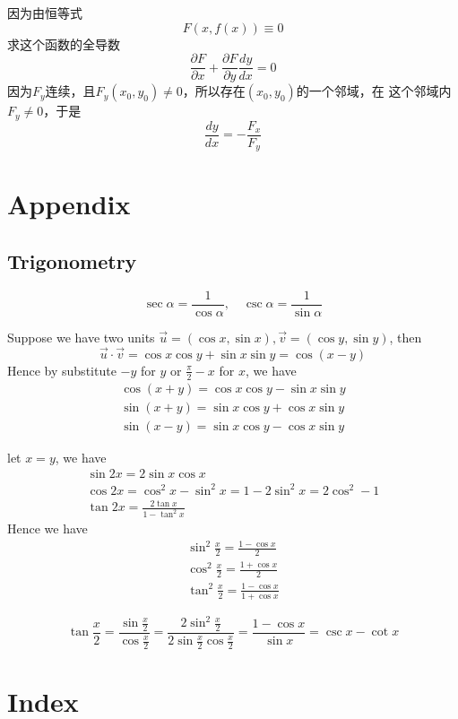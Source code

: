 \documentclass[11pt]{article}
\begin{document}
因为由恒等式
\begin{equation*}
F(x,f(x))\equiv 0
\end{equation*}
求这个函数的全导数
\begin{equation*}
\frac{\partial F}{\partial x}+\frac{\partial F}{\partial y}\frac{dy}{dx}=0
\end{equation*}
因为\(F_y\)连续，且\(F_y(x_0,y_0)\neq0\)，所以存在\((x_0,y_0)\)的一个邻域，在
这个邻域内\(F_y\neq0\)，于是
\begin{equation*}
\frac{dy}{dx}=-\frac{F_x}{F_y}
\end{equation*}

\section{Appendix}
\label{sec:orgf47d299}
\begin{appendices}
\subsection{Trigonometry}
\label{sec:orgbdcaba5}
\begin{equation*}
\sec\alpha=\frac{1}{\cos\alpha},\quad\csc\alpha=\frac{1}{\sin\alpha}
\end{equation*}

Suppose we have two units \(\vec{u}=(\cos x,\sin x),\vec{v}=(\cos y,\sin
   y)\), then
\begin{equation*}
\vec{u}\cdot\vec{v}=\cos x\cos y+\sin x\sin y=\cos(x-y)
\end{equation*}
Hence by substitute \(-y\) for \(y\) or \(\frac{\pi}{2}-x\) for \(x\), we have
\begin{gather*}
\cos(x+y)=\cos x\cos y-\sin x\sin y\\
\sin(x+y)=\sin x\cos y+\cos x\sin y\\
\sin(x-y)=\sin x\cos y-\cos x\sin y
\end{gather*}

let \(x=y\), we have
\begin{gather*}
\sin 2x=2\sin x\cos x\\
\cos 2x=\cos^2x-\sin^2x=1-2\sin^2 x=2\cos^2-1\\
\tan 2x=\frac{2\tan x}{1-\tan^2x}
\end{gather*}
Hence we have
\begin{gather*}
\sin^2\frac{x}{2}=\frac{1-\cos x}{2}\\
\cos^2\frac{x}{2}=\frac{1+\cos x}{2}\\
\tan^2\frac{x}{2}=\frac{1-\cos x}{1+\cos x}
\end{gather*}

\begin{equation*}
\tan\frac{x}{2}=\frac{\sin\frac{x}{2}}{\cos\frac{x}{2}}=
\frac{2\sin^2\frac{x}{2}}{2\sin\frac{x}{2}\cos\frac{x}{2}}=
\frac{1-\cos x}{\sin x}=\csc x-\cot x
\end{equation*}

\end{appendices}
\section{Index}
\label{sec:orga54b62c}
\renewcommand{\indexname}{}
\printindex
\end{document}
